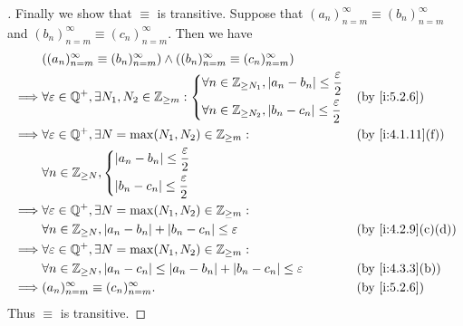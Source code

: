 \begin{proof}[]
  Finally we show that \(\equiv\) is transitive.
  Suppose that \((a_n)_{n = m}^\infty \equiv (b_n)_{n = m}^\infty\) and \((b_n)_{n = m}^\infty \equiv (c_n)_{n = m}^\infty\).
  Then we have
  \begin{align*}
             & \pa{(a_n)_{n = m}^\infty \equiv (b_n)_{n = m}^\infty} \land \pa{(b_n)_{n = m}^\infty \equiv (c_n)_{n = m}^\infty}                        \\
    \implies & \forall \varepsilon \in \Q^+, \exists N_1, N_2 \in \Z_{\geq m}: \begin{dcases}
                                                                                 \forall n \in \Z_{\geq N_1}, \abs{a_n - b_n} \leq \dfrac{\varepsilon}{2} \\
                                                                                 \forall n \in \Z_{\geq N_2}, \abs{b_n - c_n} \leq \dfrac{\varepsilon}{2}
                                                                               \end{dcases}                                    &  & \by{i:5.2.6} \\
    \implies & \forall \varepsilon \in \Q^+, \exists N = \max(N_1, N_2) \in \Z_{\geq m} :                                        &  & \by{i:4.1.11}[f]  \\
             & \forall n \in \Z_{\geq N}, \begin{dcases}
                                            \abs{a_n - b_n} \leq \dfrac{\varepsilon}{2} \\
                                            \abs{b_n - c_n} \leq \dfrac{\varepsilon}{2}
                                          \end{dcases}                                                                   \\
    \implies & \forall \varepsilon \in \Q^+, \exists N = \max(N_1, N_2) \in \Z_{\geq m} :                                                               \\
             & \forall n \in \Z_{\geq N}, \abs{a_n - b_n} + \abs{b_n - c_n} \leq \varepsilon                                     &  & \by{i:4.2.9}[c,d] \\
    \implies & \forall \varepsilon \in \Q^+, \exists N = \max(N_1, N_2) \in \Z_{\geq m} :                                                               \\
             & \forall n \in \Z_{\geq N}, \abs{a_n - c_n} \leq \abs{a_n - b_n} + \abs{b_n - c_n} \leq \varepsilon                &  & \by{i:4.3.3}[b]   \\
    \implies & (a_n)_{n = m}^\infty \equiv (c_n)_{n = m}^\infty.                                                                 &  & \by{i:5.2.6}
  \end{align*}
  Thus \(\equiv\) is transitive.
\end{proof}

